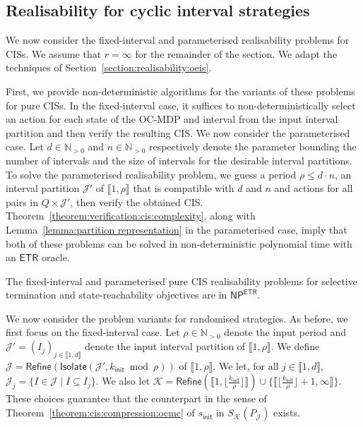 \documentclass[a4paper,UKenglish,cleveref,autoref,thm-restate,colorlinks]{lipics-v2021}
\newcommand{\init}{\mathsf{init}}
\newcommand{\integerInterval}[1]{\llbracket{}#1\rrbracket{}}
\newcommand{\np}{\textsf{NP}}
\newcommand{\etr}{\textsf{ETR}}
\newcommand{\IN}{\mathbb{N}}
\newcommand{\INpos}{\IN_{>0}}
\newcommand{\mdpStateSpace}{S}
\newcommand{\ocStateSpace}{Q}
\newcommand{\ocCount}{k}
\newcommand{\ocConfig}{s}
\newcommand{\counterUB}{r}
\newcommand{\period}{\rho}
\newcommand{\intPartB}{\mathcal{J}}
\newcommand{\intPartC}{\mathcal{K}}
\newcommand{\interval}{I}
\newcommand{\intNum}{d}
\newcommand{\intSize}{n}
\newcommand{\intIndex}{j}
\newcommand{\cisChainStateSpace}{P_{\intPartB}}
\newcommand{\compressCisStateSpace}{\mdpStateSpace_{\intPartC}({\cisChainStateSpace})}
\begin{document}
  




\subsection{Realisability for cyclic interval strategies}\label{section:realisability:cis}

We now consider the fixed-interval and parameterised realisability problems for CISs.
We assume that $\counterUB=\infty$ for the remainder of the section.
We adapt the techniques of Section~\ref{section:realisability:oeis}.

First, we provide non-deterministic algorithms for the variants of these problems for pure CISs.
In the fixed-interval case, it suffices to non-deterministically select an action for each state of the OC-MDP and interval from the input interval partition and then verify the resulting CIS.
We now consider the parameterised case.
Let $\intNum\in\INpos$ and $\intSize\in\INpos$ respectively denote the parameter bounding the number of intervals and the size of intervals for the desirable interval partitions.
To solve the parameterised realisability problem, we guess a period $\period\leq\intNum\cdot\intSize$, an interval partition $\intPartB'$ of $\integerInterval{1, \period}$ that is compatible with $\intNum$ and $\intSize$ and actions for all pairs in $\ocStateSpace\times\intPartB'$, then verify the obtained CIS.
Theorem~\ref{theorem:verification:cis:complexity}, along with Lemma~\ref{lemma:partition representation} in the parameterised case, imply that both of these problems can be solved in non-deterministic polynomial time with an $\etr$ oracle.
\begin{theorem}\label{theorem:realisability:cis:pure}
  The fixed-interval and parameterised pure CIS realisability problems for selective termination and state-reachability objectives are in $\np^\etr$.
\end{theorem}

We now consider the problem variants for randomised strategies.
As before, we first focus on the fixed-interval case.
Let $\period\in\INpos$ denote the input period and $\intPartB' = (\interval_{\intIndex})_{\intIndex\in\integerInterval{1, \intNum}}$ denote the input interval partition of $\integerInterval{1, \period}$.
We  define $\intPartB=\mathsf{Refine}(\mathsf{Isolate}(\intPartB', \ocCount_\init\bmod\period))$ of $\integerInterval{1, \period}$.
We let, for all $\intIndex\in\integerInterval{1, \intNum}$, $\intPartB_\intIndex = \{\interval\in\intPartB\mid\interval\subseteq\interval_\intIndex\}$.
We also let $\intPartC = \mathsf{Refine}(\integerInterval{1, \lfloor\frac{\ocCount_\init}{\period}\rfloor})\cup\{\integerInterval{\lfloor\frac{\ocCount_\init}{\period}\rfloor+1, \infty}\}$.
These choices guarantee that the counterpart in the sense of Theorem~\ref{theorem:cis:compression:ocmc} of $\ocConfig_\init$ in $\compressCisStateSpace$ exists.
\end{document}
